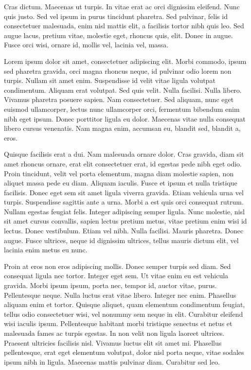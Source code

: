 Cras dictum. Maecenas ut turpis. In vitae erat ac orci dignissim eleifend. Nunc quis justo. Sed vel ipsum in purus tincidunt pharetra. Sed pulvinar, felis id consectetuer malesuada, enim nisl mattis elit, a facilisis tortor nibh quis leo. Sed augue lacus, pretium vitae, molestie eget, rhoncus quis, elit. Donec in augue. Fusce orci wisi, ornare id, mollis vel, lacinia vel, massa.

Lorem ipsum dolor sit amet, consectetuer adipiscing elit. Morbi commodo, ipsum sed pharetra gravida, orci magna rhoncus neque, id pulvinar odio lorem non turpis. Nullam sit amet enim. Suspendisse id velit vitae ligula volutpat condimentum. Aliquam erat volutpat. Sed quis velit. Nulla facilisi. Nulla libero. Vivamus pharetra posuere sapien. Nam consectetuer. Sed aliquam, nunc eget euismod ullamcorper, lectus nunc ullamcorper orci, fermentum bibendum enim nibh eget ipsum. Donec porttitor ligula eu dolor. Maecenas vitae nulla consequat libero cursus venenatis. Nam magna enim, accumsan eu, blandit sed, blandit a, eros.

Quisque facilisis erat a dui. Nam malesuada ornare dolor. Cras gravida, diam sit amet rhoncus ornare, erat elit consectetuer erat, id egestas pede nibh eget odio. Proin tincidunt, velit vel porta elementum, magna diam molestie sapien, non aliquet massa pede eu diam. Aliquam iaculis. Fusce et ipsum et nulla tristique facilisis. Donec eget sem sit amet ligula viverra gravida. Etiam vehicula urna vel turpis. Suspendisse sagittis ante a urna. Morbi a est quis orci consequat rutrum. Nullam egestas feugiat felis. Integer adipiscing semper ligula. Nunc molestie, nisl sit amet cursus convallis, sapien lectus pretium metus, vitae pretium enim wisi id lectus. Donec vestibulum. Etiam vel nibh. Nulla facilisi. Mauris pharetra. Donec augue. Fusce ultrices, neque id dignissim ultrices, tellus mauris dictum elit, vel lacinia enim metus eu nunc.

Proin at eros non eros adipiscing mollis. Donec semper turpis sed diam. Sed consequat ligula nec tortor. Integer eget sem. Ut vitae enim eu est vehicula gravida. Morbi ipsum ipsum, porta nec, tempor id, auctor vitae, purus. Pellentesque neque. Nulla luctus erat vitae libero. Integer nec enim. Phasellus aliquam enim et tortor. Quisque aliquet, quam elementum condimentum feugiat, tellus odio consectetuer wisi, vel nonummy sem neque in elit. Curabitur eleifend wisi iaculis ipsum. Pellentesque habitant morbi tristique senectus et netus et malesuada fames ac turpis egestas. In non velit non ligula laoreet ultrices. Praesent ultricies facilisis nisl. Vivamus luctus elit sit amet mi. Phasellus pellentesque, erat eget elementum volutpat, dolor nisl porta neque, vitae sodales ipsum nibh in ligula. Maecenas mattis pulvinar diam. Curabitur sed leo.


